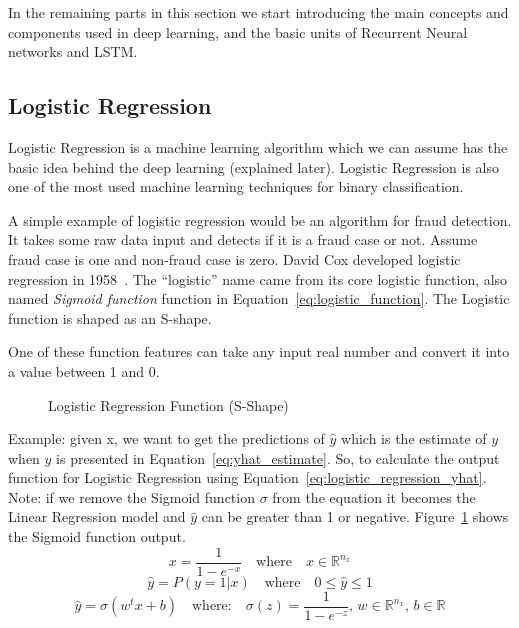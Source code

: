 In the remaining parts in this section we start introducing the main concepts and components used in deep learning, and the basic units of Recurrent Neural networks and LSTM.%

\subsection{Logistic Regression}


Logistic Regression is a machine learning algorithm which we can assume has the basic idea behind the deep learning (explained later). Logistic Regression is also one of the most used machine learning techniques for binary classification.

A simple example of logistic regression would be an algorithm for fraud detection. It takes some raw data input and detects if it is a fraud case or not. Assume fraud case is one and non-fraud case is zero. David Cox developed logistic regression in 1958~\cite{Cox2958}. The “logistic” name came from its core logistic function, also named \textit{Sigmoid function} function in Equation~\eqref{eq:logistic_function}. The Logistic function is shaped as an S-shape.

One of these function features can take any input real number and convert it into a value between 1 and 0.%
\begin{figure}[!ht]
\centering

\caption{Logistic Regression Function (S-Shape)}\label{Fig:Logistic}
\end{figure}%

Example: given x, we want to get the predictions of $\widehat{y}$ which is the estimate of $y$ when $\widehat{y}$ is presented in Equation~\eqref{eq:yhat_estimate}. So, to calculate the output function for Logistic Regression using Equation~\eqref{eq:logistic_regression_yhat}. Note: if we remove the Sigmoid function $\sigma$ from the equation it becomes the Linear Regression model and $\widehat{y}$ can be greater than 1 or negative. Figure~\ref{Fig:Logistic} shows the Sigmoid function output.%
\begin{equation}\label{eq:logistic_function}
 x = \frac{1}{1-e^{-x}} \quad \text{where} \quad x \in \mathbb{R}^{n_x} 
\end{equation}
\begin{equation}
 \label{eq:yhat_estimate}
  \widehat{y} = P(y=1 | x) \quad \text{where} \quad 0 \le \widehat{y} \le 1
 \end{equation}
\begin{equation}
 \label{eq:logistic_regression_yhat}
 \widehat{y} = \sigma(w^t x + b) \quad \text{where:} \quad \sigma(z) = \frac{1}{1-e^{-z}} \text{, } w \in \mathbb{R}^{n_x} \text{, } b \in \mathbb{R} 
\end{equation}%
%
